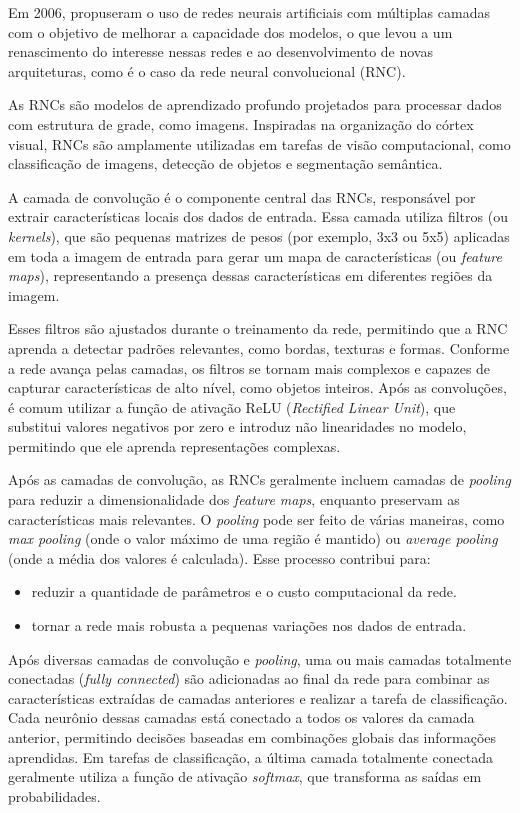 Em 2006, \cite{Hinton2006} propuseram o uso de redes neurais artificiais com múltiplas camadas com o objetivo de melhorar a capacidade dos modelos, o que levou a um renascimento do interesse nessas redes e ao desenvolvimento de novas arquiteturas, como é o caso da rede neural convolucional (RNC).

As RNCs são modelos de aprendizado profundo projetados para processar dados com estrutura de grade, como imagens. Inspiradas na organização do córtex visual, RNCs são amplamente utilizadas em tarefas de visão computacional, como classificação de imagens, detecção de objetos e segmentação semântica.

A camada de convolução é o componente central das RNCs, responsável por extrair características locais dos dados de entrada. Essa camada utiliza filtros (ou \textit{kernels}), que são pequenas matrizes de pesos (por exemplo, 3x3 ou 5x5) aplicadas em toda a imagem de entrada para gerar um mapa de características (ou \textit{feature maps}), representando a presença dessas características em diferentes regiões da imagem.

Esses filtros são ajustados durante o treinamento da rede, permitindo que a RNC aprenda a detectar padrões relevantes, como bordas, texturas e formas. Conforme a rede avança pelas camadas, os filtros se tornam mais complexos e capazes de capturar características de alto nível, como objetos inteiros. Após as convoluções, é comum utilizar a função de ativação ReLU (\textit{Rectified Linear Unit}), que substitui valores negativos por zero e introduz não linearidades no modelo, permitindo que ele aprenda representações complexas.

Após as camadas de convolução, as RNCs geralmente incluem camadas de \textit{pooling} para reduzir a dimensionalidade dos \textit{feature maps}, enquanto preservam as características mais relevantes. O \textit{pooling} pode ser feito de várias maneiras, como \textit{max pooling} (onde o valor máximo de uma região é mantido) ou \textit{average pooling} (onde a média dos valores é calculada). Esse processo contribui para:

\begin{itemize}
    \item reduzir a quantidade de parâmetros e o custo computacional da rede.
    \item tornar a rede mais robusta a pequenas variações nos dados de entrada.
\end{itemize}

Após diversas camadas de convolução e \textit{pooling}, uma ou mais camadas totalmente conectadas (\textit{fully connected}) são adicionadas ao final da rede para combinar as características extraídas de camadas anteriores e realizar a tarefa de classificação. Cada neurônio dessas camadas está conectado a todos os valores da camada anterior, permitindo decisões baseadas em combinações globais das informações aprendidas. Em tarefas de classificação, a última camada totalmente conectada geralmente utiliza a função de ativação \textit{softmax}, que transforma as saídas em probabilidades.

